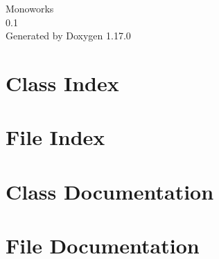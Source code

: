 \documentclass[twoside]{book}
\newcommand{\+}{\discretionary{\mbox{\scriptsize$\hookleftarrow$}}{}{}}
\newcommand{\clearemptydoublepage}{%
    \newpage{\pagestyle{empty}\cleardoublepage}%
  }
\begin{document}
  \raggedbottom
    \hypersetup{pageanchor=false,
                bookmarksnumbered=true,
                pdfencoding=unicode
               }
  \begin{titlepage}
  \vspace*{7cm}
  \begin{center}%
  {\Large Monoworks}\\
  [1ex]\large 0.\+1 \\
  \vspace*{1cm}
  {\large Generated by Doxygen 1.17.0}\\
  \end{center}
  \end{titlepage}
  \clearemptydoublepage
  \tableofcontents
  \clearemptydoublepage
  \hypersetup{pageanchor=true}
\chapter{Class Index}

\chapter{File Index}

\chapter{Class Documentation}



\chapter{File Documentation}














  \backmatter
  \newpage
  \clearemptydoublepage
  \printindex
\end{document}
